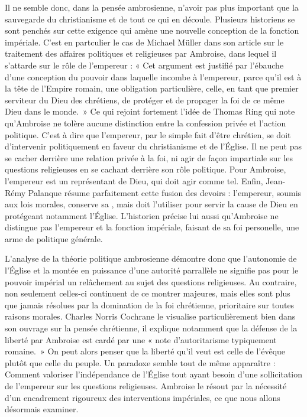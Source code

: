 Il ne semble donc, dans la pensée ambrosienne, n'avoir pas plus important que la sauvegarde du christianisme et de tout ce qui en découle. Plusieurs historiens se sont penchés sur cette exigence qui amène une nouvelle conception de la fonction impériale. C'est en partculier le cas de Michael Müller dans son article sur le traitement des affaires politiques et religieuses par Ambroise, dans lequel il s'attarde sur le rôle de l'empereur : « Cet argument est justifié par l’ébauche d'une conception du pouvoir dans laquelle incombe à l’empereur, parce qu’il est à la tête de l’Empire romain, une obligation particulière, celle, en tant que premier serviteur du Dieu des chrétiens, de protéger et de propager la foi de ce même Dieu dans le monde.\autocite[Page ???]{muller_conflits}~» Ce qui rejoint fortement l'idée de Thomas Ring qui note qu'Ambroise ne tolère aucune distinction entre la confession privée et l'action politique\autocite[124]{ring_auctoritas}. C'est à dire que l'empereur, par le simple fait d'être chrétien, se doit d'intervenir politiquement en faveur du christianisme et de l'Église. Il ne peut pas se cacher derrière une relation privée à la foi, ni agir de façon impartiale sur les questions religieuses en se cachant derrière son rôle politique. Pour Ambroise, l'empereur est un représentant de Dieu, qui doit agir comme tel. Enfin, Jean-Rémy Palanque résume parfaitement cette fusion des devoirs : l'empereur, soumis aux lois morales, conserve sa , mais doit l'utiliser pour servir la cause de Dieu en protégeant notamment l'Église. L'historien précise lui aussi qu'Ambroise ne distingue pas l'empereur et la fonction impériale, faisant de sa foi personelle, une arme de politique générale\autocite[355]{palanque_ambroise}.

\bigskip

L'analyse de la théorie politique ambrosienne démontre donc que l'autonomie de l'Église et la montée en puissance d'une autorité parrallèle ne signifie pas pour le pouvoir impérial un relâchement au sujet des questions religieuses. Au contraire, non seulement celles-ci continuent de ce montrer majeures, mais elles sont plus que jamais résolues par la domination de la foi chrétienne, prioritaire sur toutes raisons morales. Charles Norris Cochrane le visualise particulièrement bien dans son ouvrage sur la pensée chrétienne, il explique notamment que la défense de la liberté par Ambroise est cardé par une « note d'autoritarisme typiquement romaine.\autocite[355]{cochrane_christianity}~» On peut alors penser que la liberté qu'il veut est celle de l'évêque plutôt que celle du peuple. Un paradoxe semble tout de même apparaître : Comment valoriser l'indépendance de l'Église tout ayant besoin d'une sollicitation de l'empereur sur les questions religieuses. Ambroise le résout par la nécessité d'un encadrement rigoureux des interventions impériales, ce que nous allons désormais examiner.

